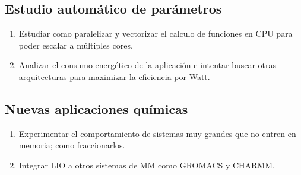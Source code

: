 \subsection{Estudio autom\'atico de par\'ametros}
\begin{enumerate}
  \item Estudiar como paralelizar y vectorizar el calculo de funciones en CPU para poder escalar a m\'ultiples cores.
  \item Analizar el consumo energ\'etico de la aplicaci\'on e intentar buscar otras arquitecturas para maximizar
    la eficiencia por Watt.
\end{enumerate}

\subsection{Nuevas aplicaciones qu\'imicas}
\begin{enumerate}
  \item Experimentar el comportamiento de sistemas muy grandes que no entren en memoria; como fraccionarlos.
  \item Integrar LIO a otros sistemas de MM como GROMACS y CHARMM.
\end{enumerate}
